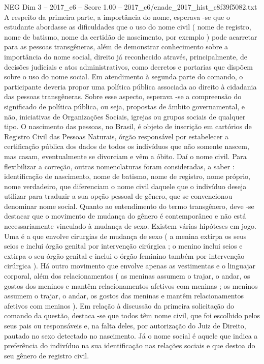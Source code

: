 \begin{textsample}{NEG Dim 3 – 2017\_c6 – Score 1.00 – 2017\_c6/enade\_2017\_hist\_c8f39f5082.txt}
A respeito da primeira parte, a importância do nome, esperava -se que o estudante abordasse as dificuldades que o uso do nome civil ( nome de registro, nome de batismo, nome da certidão de nascimento, por exemplo ) pode acarretar para as pessoas transgêneras, além de demonstrar conhecimento sobre a importância do nome social, direito já reconhecido através, principalmente, de decisões judiciais e atos administrativos, como decretos e portarias que dispõem sobre o uso do nome social.
Em atendimento à segunda parte do comando, o participante deveria propor uma política pública associada ao direito à cidadania das pessoas transgêneras.
Sobre esse aspecto, esperava -se a compreensão do significado de política pública, ou seja, propostas de âmbito governamental, e não, iniciativas de Organizações Sociais, igrejas ou grupos sociais de qualquer tipo.
O nascimento das pessoas, no Brasil, é objeto de inscrição em cartórios de Registro Civil das Pessoas Naturais, órgão responsável por estabelecer a certificação pública dos dados de todos os indivíduos que não somente nascem, mas casam, eventualmente se divorciam e vêm a óbito.
Daí o nome civil.
Para flexibilizar a correção, outras nomenclaturas foram consideradas, a saber : identificação de nascimento, nome de batismo, nome de registro, nome próprio, nome verdadeiro, que diferenciam o nome civil daquele que o indivíduo deseja utilizar para traduzir a sua opção pessoal de gênero, que se convencionou denominar nome social.
Quanto ao entendimento do termo transgênero, deve -se destacar que o movimento de mudança do gênero é contemporâneo e não está necessariamente vinculado à mudança de sexo.
Existem várias hipóteses em jogo.
Uma é a que envolve cirurgias de mudança de sexo ( a menina extirpa os seus seios e inclui órgão genital por intervenção cirúrgica ; o menino inclui seios e extirpa o seu órgão genital e inclui o órgão feminino também por intervenção cirúrgica ).
Há outro movimento que envolve apenas as vestimentas e o linguajar corporal, além dos relacionamentos ( as meninas assumem o trajar, o andar, os gostos dos meninos e mantêm relacionamentos afetivos com meninas ; os meninos assumem o trajar, o andar, os gostos das meninas e mantêm relacionamentos afetivos com meninos ).
Em relação à discussão da primeira solicitação do comando da questão, destaca -se que todos têm nome civil, que foi escolhido pelos seus pais ou responsáveis e, na falta deles, por autorização do Juiz de Direito, pautado no sexo detectado no nascimento.
Já o nome social é aquele que indica a preferência do indivíduo na sua identificação nas relações sociais e que destoa do seu gênero de registro civil.

\end{textsample}
